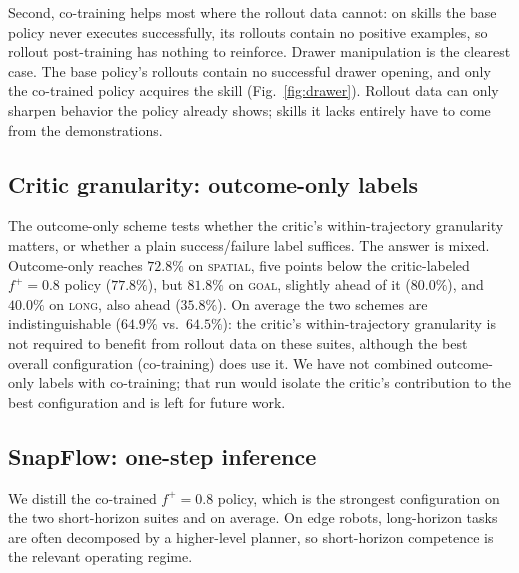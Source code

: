 \documentclass[conference]{IEEEtran}
\newcommand{\pf}{\ensuremath{f^{+}}}   %
\begin{document}
Second, co-training helps most where the rollout data cannot: on skills the base policy
never executes successfully, its rollouts contain no positive examples, so rollout
post-training has nothing to reinforce. Drawer manipulation is the clearest case. The base
policy's rollouts contain no successful drawer opening, and only the co-trained policy
acquires the skill (Fig.~\ref{fig:drawer}). Rollout data can only sharpen behavior the
policy already shows; skills it lacks entirely have to come from the demonstrations.

\subsection{Critic granularity: outcome-only labels}
The outcome-only scheme tests whether the critic's within-trajectory granularity matters,
or whether a plain success/failure label suffices. The answer is mixed. Outcome-only
reaches $72.8\%$ on \textsc{spatial}, five points below the critic-labeled $\pf{=}0.8$
policy ($77.8\%$), but $81.8\%$ on \textsc{goal}, slightly ahead of it ($80.0\%$), and
$40.0\%$ on \textsc{long}, also ahead ($35.8\%$). On average the two schemes are
indistinguishable ($64.9\%$ vs.\ $64.5\%$): the critic's within-trajectory granularity is
not required to benefit from rollout data on these suites, although the best overall
configuration (co-training) does use it. We have not combined outcome-only labels with
co-training; that run would isolate the critic's contribution to the best configuration
and is left for future work.

\subsection{SnapFlow: one-step inference}\label{sec:snapflow}
We distill the co-trained $\pf{=}0.8$ policy, which is the strongest configuration on the
two short-horizon suites and on average. On edge robots, long-horizon tasks are often
decomposed by a higher-level planner, so short-horizon competence is the relevant
operating regime.
\end{document}
